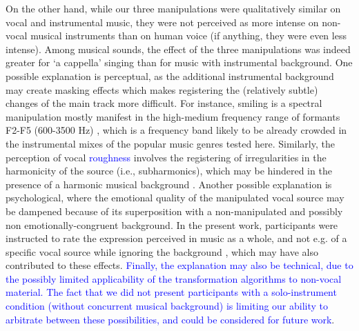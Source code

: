 \documentclass[openacc]{rsprocb_new}%
\begin{document}
On the other hand, while our three manipulations were qualitatively similar on vocal and instrumental music, they were not perceived as more intense on non-vocal musical instruments than on human voice (if anything, they were even less intense). Among musical sounds, the effect of the three manipulations was indeed greater for `a cappella' singing than for music with instrumental background. One possible explanation is perceptual, as the additional instrumental background may create masking effects which makes registering the (relatively subtle) changes of the main track more difficult. For instance, smiling is a spectral manipulation mostly manifest in the high-medium frequency range of formants F2-F5 (600-3500 Hz) \cite{PONS18}, which is a frequency band likely to be already crowded in the instrumental mixes of the popular music genres tested here. Similarly, the perception of vocal \textcolor{blue}{roughness} involves the registering of irregularities in the harmonicity of the source (i.e., subharmonics), which may be hindered in the presence of a harmonic musical background \cite{LIU20-2}. Another possible explanation is psychological, where the emotional quality of the manipulated vocal source may be dampened because of its superposition with a non-manipulated and possibly non emotionally-congruent background. In the present work, participants were instructed to rate the expression perceived in music as a whole, and not e.g. of a specific vocal source while ignoring the background \cite{LIU20-2}, which may have also contributed to these effects. \textcolor{blue}{Finally, the explanation may also be technical, due to the possibly limited applicability of the transformation algorithms to non-vocal material. The fact that we did not present participants with a solo-instrument condition (without concurrent musical background) is limiting our ability to arbitrate between these possibilities, and could be considered for future work}. 
\end{document}
